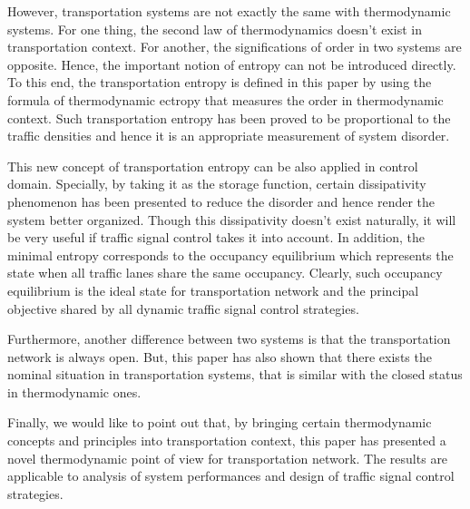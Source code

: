 \documentclass[preprint,authoryear,12pt]{elsarticle}
\begin{document}
However, transportation systems are not exactly the same with thermodynamic systems. For one thing, the second law of thermodynamics doesn't exist in transportation context. For another, the significations of order in two systems are opposite. Hence, the important notion of entropy can not be introduced directly. To this end, the transportation entropy is defined in this paper by using the formula of thermodynamic ectropy that measures the order in thermodynamic context. Such transportation entropy has been proved to be proportional to the traffic densities and hence it is an appropriate measurement of system disorder.

This new concept of transportation entropy can be also applied in control domain. Specially, by taking it as the storage function, certain dissipativity phenomenon has been presented to reduce the disorder and hence render the system better organized. Though this dissipativity doesn't exist naturally, it will be very useful if traffic signal control takes it into account.
In addition, the minimal entropy corresponds to the occupancy equilibrium which represents the state when all traffic lanes share the same occupancy. Clearly, such occupancy equilibrium is the ideal state for transportation network and the principal objective shared by all dynamic traffic signal control strategies.


Furthermore, another difference between two systems is that the transportation network is always open. But, this paper has also shown that there exists the nominal situation in transportation systems, that is similar with the closed status in thermodynamic ones.

Finally, we would like to point out that, by bringing certain thermodynamic concepts and principles into transportation context, this paper has presented a novel thermodynamic point of view for transportation network. The results are applicable to analysis of system performances and design of traffic signal control strategies.



\end{document}
